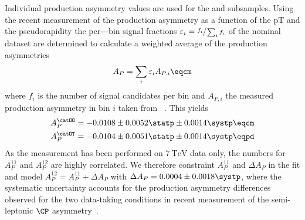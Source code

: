 Individual production asymmetry values are used for the \catOO and \catOT
subsamples. Using the recent \LHCb measurement \cite{Aaij:2014bba} of the
production asymmetry as a function of the \acf{pT} and the \acf{pseudorapidity}
the per-\pT-\pseudorapidity-bin signal fractions $\varepsilon_i =
\sfrac{f_i}{\sum_i f_i}$ of the nominal dataset are determined to calculate a
weighted average of the production asymmetries
%
\begin{equation}
  A_P = \sum_i \varepsilon_i A_{P,i}\eqcm
\end{equation}
where $f_i$ is the number of signal candidates per bin and $A_{P,i}$ the
measured production asymmetry in bin $i$ taken from \Ref~\cite{Aaij:2014bba}.
This yields
%
\begin{equation}
  \begin{split}
    A_P^{\catOO} &= -0.0108 \pm 0.0052 \statp \pm 0.0014 \systp \eqcm \\
    A_P^{\catOT} &= -0.0104 \pm 0.0051 \statp \pm 0.0014 \systp \eqpd \\
  \end{split}
\end{equation}
%
As the measurement has been performed on $\SI{7}{\TeV}$ data only, the numbers
for $A_P^{11}$ and $A_P^{12}$ are highly correlated. We therefore constraint
$A_P^{11}$ and $\Delta A_P$ in the fit and model $A_P^{12} = A_P^{11} +
\Delta A_P$ with $\Delta A_P = 0.0004 \pm 0.0018 \systp$, where
the systematic uncertainty accounts for the production asymmetry differences
observed for the two data-taking conditions in  recent measurement of
the semi-leptonic $\CP$ asymmetry~\cite{Aaij:2014nxa}.
%
